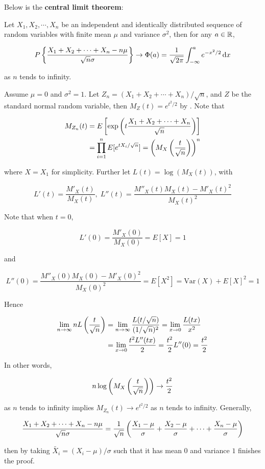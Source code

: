 \documentclass[a4paper,12pt]{article}
\begin{document}
Below is the \textbf{central limit theorem}:\n

\begin{thm}
  Let $X_{1},X_{2},\cdots,X_{n}$ be an independent and identically distributed sequence of random variables with finite mean $\mu$ and variance $\sigma^{2}$, then for any $a\in\mathbb{R}$,

  $$P\left\{ \frac{X_{1}+X_{2}+\cdots+X_{n}-n\mu}{\sqrt{n}\sigma}\right\}\to\Phi(a)=\frac{1}{\sqrt{2\pi}}\int_{-\infty}^{a}e^{-x^{2}/2}\,\mathrm{d} x$$\s

  as $n$ tends to infinity.\n

  \prf Assume $\mu=0$ and $\sigma^{2}=1$. Let $Z_{n}=(X_{1}+X_{2}+\cdots+X_{n})/\sqrt{n}$, and $Z$ be the standard normal random variable, then $M_{Z}(t)=e^{t^{2}/2}$ by \rexm[\sctd{10}]. Note that

  $$\begin{aligned}[t]
    M_{Z_{n}}(t)&=E\left[ \exp\left( t\frac{X_{1}+X_{2}+\cdots+X_{n}}{\sqrt{n}}\right)\right]\\
    &=\prod_{i=1}^{n}E[e^{tX_{i}/\sqrt{n}}]=\left( M_{X}\left( \frac{t}{\sqrt{n}}\right)\right)^{n}
  \end{aligned}$$\s

  where $X=X_{1}$ for simplicity. Further let $L(t)=\log(M_{X}(t))$, with

  $$L'(t)=\frac{M'_{X}(t)}{M_{X}(t)},\;L''(t)=\frac{M''_{X}(t)M_{X}(t)-M'_{X}(t)^{2}}{M_{X}(t)^{2}}$$\s

  Note that when $t=0$,

  $$L'(0)=\frac{M'_{X}(0)}{M_{X}(0)}=E[X]=1$$\s

  and

  $$L''(0)=\frac{M''_{X}(0)M_{X}(0)-M'_{X}(0)^{2}}{M_{X}(0)^{2}}=E[X^{2}]=\mathrm{Var}(X)+E[X]^{2}=1$$\s

  Hence

  $$\begin{aligned}[t]
    \lim_{n\to\infty}nL\left( \frac{t}{\sqrt{n}}\right)&=\lim_{n\to\infty}\frac{L(t/\sqrt{n})}{(1/\sqrt{n})^{2}}=\lim_{x\to 0}\frac{L(tx)}{x^{2}}\\
    &=\lim_{x\to 0}\frac{t^{2}L''(tx)}{2}=\frac{t^{2}}{2}L''(0)=\frac{t^{2}}{2}
  \end{aligned}$$\s

  In other words,

  $$n\log\left( M_{X}\left( \frac{t}{\sqrt{n}}\right)\right)\to\frac{t^{2}}{2}$$\s

  as $n$ tends to infinity implies $M_{Z_{n}}(t)\to e^{t^{2}/2}$ as $n$ tends to infinity. Generally,

  $$\frac{X_{1}+X_{2}+\cdots+X_{n}-n\mu}{\sqrt{n}\sigma}=\frac{1}{\sqrt{n}}\left( \frac{X_{1}-\mu}{\sigma}+\frac{X_{2}-\mu}{\sigma}+\cdots+\frac{X_{n}-\mu}{\sigma}\right)$$\s

  then by taking $\tilde{X_{i}}=(X_{i}-\mu)/\sigma$ such that it has mean $0$ and variance $1$ finishes the proof.
\end{thm}\n
\end{document}
